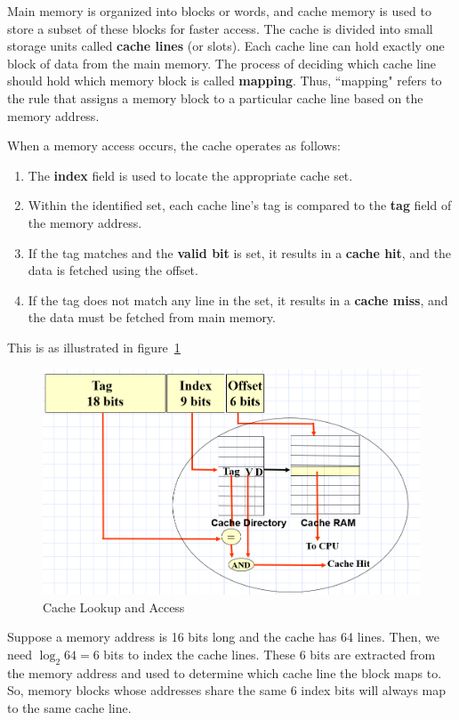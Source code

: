 \documentclass[12pt]{book}
\begin{document}
Main memory is organized into blocks or words, and cache memory is used to store a subset of these blocks for faster access. The cache is divided into small storage units called \textbf{cache lines} (or slots). Each cache line can hold exactly one block of data from the main memory. The process of deciding which cache line should hold which memory block is called \textbf{mapping}. Thus, ``mapping" refers to the rule that assigns a memory block to a particular cache line based on the memory address.

When a memory access occurs, the cache operates as follows:
\begin{enumerate}
    \item The \textbf{index} field is used to locate the appropriate cache set.
    \item Within the identified set, each cache line's tag is compared to the \textbf{tag} field of the memory address.
    \item If the tag matches and the \textbf{valid bit} is set, it results in a \textbf{cache hit}, and the data is fetched using the offset.
    \item If the tag does not match any line in the set, it results in a \textbf{cache miss}, and the data must be fetched from main memory.
\end{enumerate}
This is as illustrated in figure~\ref{fig:cache_lookup}
\begin{figure}
    \centering
    \includegraphics[width=0.7\linewidth]{images/mem_access.png}
    \caption{Cache Lookup and Access}
    \label{fig:cache_lookup}
\end{figure}
\begin{example}
Suppose a memory address is 16 bits long and the cache has 64 lines. Then, we need $\log_2 64 = 6$ bits to index the cache lines. These 6 bits are extracted from the memory address and used to determine which cache line the block maps to. So, memory blocks whose addresses share the same 6 index bits will always map to the same cache line.
\end{example}
\end{document}

